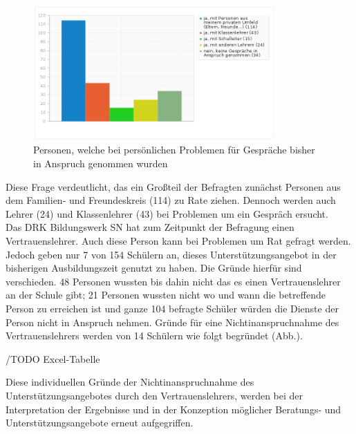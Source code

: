 \begin{figure}[hp]
	\centering
		\includegraphics[width=1.0\textwidth]{images/welche-Personen-wurden-bisher-bei-persoenlichen-Problemen-in-der-zurueckliegenden-Ausbildungszeit-fuer-Gespraeche-in-Anspruch-genommen.png}
	\caption{Personen, welche bei persönlichen Problemen für Gespräche bisher in Anspruch genommen wurden}
	\label{fig:welche-Personen-wurden-bisher bei-persoenlichen-Problemen-in-der-zurueckliegenden-Ausbildungszeit-fuer-Gespraeche-in-Anspruch-genommen}
\end{figure}

Diese Frage verdeutlicht, das ein Großteil der Befragten zunächst Personen aus dem Familien- und Freundeskreis (114) zu Rate ziehen. Dennoch werden auch Lehrer (24) und Klassenlehrer (43) bei Problemen um ein Gespräch ersucht.\\

Das DRK Bildungswerk SN hat zum Zeitpunkt der Befragung einen Vertrauenslehrer. Auch diese Person kann bei Problemen um Rat gefragt werden. Jedoch geben nur 7 von 154 Schülern an, dieses Unterstützungsangebot in der bisherigen Ausbildungszeit genutzt zu haben. Die Gründe hierfür sind verschieden. 48 Personen wussten bis dahin nicht das es einen Vertrauenslehrer an der Schule gibt; 21 Personen wussten nicht wo und wann die betreffende Person zu erreichen ist und ganze 104 befragte Schüler würden die Dienste der Person nicht in Anspruch nehmen. Gründe für eine Nichtinanspruchnahme des Vertrauenslehrers werden von 14 Schülern wie folgt begründet (Abb.). 

/TODO Excel-Tabelle

Diese individuellen Gründe der Nichtinanspruchnahme des Unterstützungsangebotes durch den Vertrauenslehrers, werden bei der Interpretation der Ergebnisse und in der Konzeption möglicher Beratungs- und Unterstützungsangebote erneut aufgegriffen.\\

